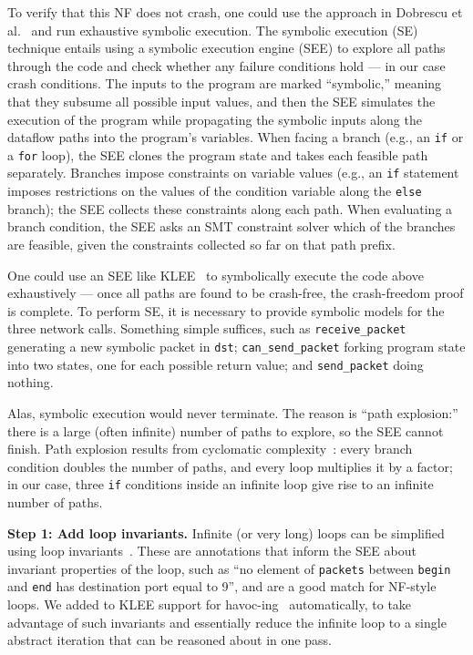 \documentclass[letterpaper,twocolumn,10pt]{article}
\newcommand{\code}[1]{\texttt{#1}}
\begin{document}
To verify that this NF does not crash, one could use the approach in Dobrescu et al.~\cite{dobrescu2014software} and run exhaustive symbolic execution. The symbolic execution (SE) technique entails using a symbolic execution engine (SEE) to explore all paths through the code and check whether any failure conditions hold --- in our case crash conditions. The inputs to the program are marked ``symbolic,'' meaning that they subsume all possible input values, and then the SEE simulates the execution of the program while propagating the symbolic inputs along the dataflow paths into the program's variables. When facing a branch (e.g., an \code{if} or a \code{for} loop), the SEE clones the program state and takes each feasible path separately. Branches impose constraints on variable values (e.g., an \code{if} statement imposes restrictions on the values of the condition variable along the \code{else} branch); the SEE collects these constraints along each path. When evaluating a branch condition, the SEE asks an SMT constraint solver which of the branches are feasible, given the constraints collected so far on that path prefix.

One could use an SEE like KLEE~\cite{cadar2008klee} to symbolically execute the code above exhaustively --- once all paths are found to be crash-free, the crash-freedom proof is complete. To perform SE, it is necessary to provide symbolic models for the three network calls. Something simple suffices, such as \code{receive\_packet} generating a new symbolic packet in \code{dst}; \code{can\_send\_packet} forking program state into two states, one for each possible return value; and \code{send\_packet} doing nothing. 

Alas, symbolic execution would never terminate. The reason is ``path explosion:'' there is a large (often infinite) number of paths to explore, so the SEE cannot finish.  Path explosion results from cyclomatic complexity~\cite{mccabe:cyclomatic}: every branch condition doubles the number of paths, and every loop multiplies it by a factor; in our case, three \code{if} conditions inside an infinite loop give rise to an infinite number of paths. 

{\bf Step 1: Add loop invariants.} Infinite (or very long) loops can be simplified using loop invariants~\cite[\S~2.1]{cormen2009introduction}. These are annotations that inform the SEE about invariant properties of the loop, such as ``no element of \code{packets} between \code{begin} and \code{end} has destination port equal to 9'', and are a good match for NF-style loops.  We added to KLEE support for havoc-ing~\cite{boogie} automatically, to take advantage of such invariants and essentially reduce the infinite loop to a single abstract iteration that can be reasoned about in one pass.
 
\end{document}
